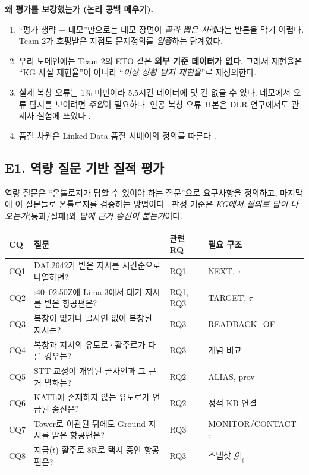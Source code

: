\documentclass[10pt,a4paper]{article}
\newcommand{\cmd}[1]{\textsf{\small #1}}
\newcommand{\G}{\mathcal{G}}
\begin{document}
\begin{addbox}
\textbf{왜 평가를 보강했는가 (논리 공백 메우기).}
\begin{enumerate}[leftmargin=14pt]
\item ``평가 생략 + 데모''만으로는 데모 장면이 \emph{골라 뽑은 사례}라는 반론을 막기 어렵다. Team 2가 호평받은 지점도 문제정의를 \emph{입증}하는 단계였다.
\item 우리 도메인에는 Team 2의 ETO 같은 \textbf{외부 기준 데이터가 없다}. 그래서 재현율은 ``KG 사실 재현율''이 아니라 ``\emph{이상 상황 탐지 재현율}''로 재정의한다.
\item 실제 복창 오류는 1\% 미만이라 \cite{cardosi94} 5.5시간 데이터에 몇 건 없을 수 있다. 데모에서 오류 탐지를 보이려면 \emph{주입}이 필요하다. 인공 복창 오류 표본은 DLR 연구에서도 관제사 실험에 쓰였다 \cite{helmke2022}.
\item 품질 차원은 Linked Data 품질 서베이의 정의를 따른다 \cite{zaveri2016}.
\end{enumerate}
\end{addbox}

\subsection*{E1. 역량 질문 기반 질적 평가}
역량 질문은 ``온톨로지가 답할 수 있어야 하는 질문''으로 요구사항을 정의하고, 마지막에 이 질문들로 온톨로지를 검증하는 방법이다 \cite{gruninger1995,noy2001}. 판정 기준은 \emph{KG에서 질의로 답이 나오는가}(통과/실패)와 \emph{답에 근거 송신이 붙는가}이다.
\begin{center}\small
\begin{tabularx}{\textwidth}{@{}l>{\raggedright\arraybackslash}X l l@{}}
\toprule
CQ & 질문 & 관련 RQ & 필요 구조\\\midrule
CQ1 & DAL2642가 받은 지시를 시간순으로 나열하면? & RQ1 & \cmd{NEXT}, $\tau$\\
CQ2 & 02:40--02:50Z에 Lima 3에서 대기 지시를 받은 항공편은? & RQ1, RQ3 & \cmd{TARGET}, $\tau$\\
CQ3 & 복창이 없거나 콜사인 없이 복창된 지시는? & RQ3 & \cmd{READBACK\_OF}\\
CQ4 & 복창과 지시의 유도로·활주로가 다른 경우는? & RQ3 & 개념 비교\\
CQ5 & STT 교정이 개입된 콜사인과 그 근거 발화는? & RQ2 & \cmd{ALIAS}, prov\\
CQ6 & KATL에 존재하지 않는 유도로가 언급된 송신은? & RQ2 & 정적 KB 연결\\
CQ7 & Tower로 이관된 뒤에도 Ground 지시를 받은 항공편은? & RQ3 & \cmd{MONITOR}/\cmd{CONTACT} $\tau$\\
CQ8 & 지금($t$) 활주로 8R로 택시 중인 항공편은? & RQ3 & 스냅샷 $\G|_t$\\
\bottomrule
\end{tabularx}
\end{center}
\end{document}
